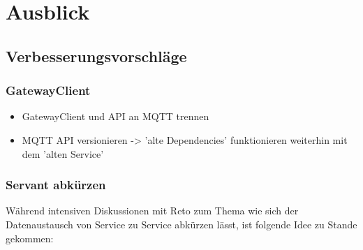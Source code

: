 \chapter{Ausblick}
\section{Verbesserungsvorschläge}
\subsection{GatewayClient}
\begin{itemize}
	\item
	GatewayClient und API an MQTT trennen
	
	\item
	MQTT API versionieren -> 'alte Dependencies' funktionieren weiterhin mit dem 'alten Service'
\end{itemize}

\subsection{Servant abkürzen}
Während intensiven Diskussionen mit Reto zum Thema wie sich der Datenaustausch von Service zu Service abkürzen lässt, ist folgende Idee zu Stande gekommen:


